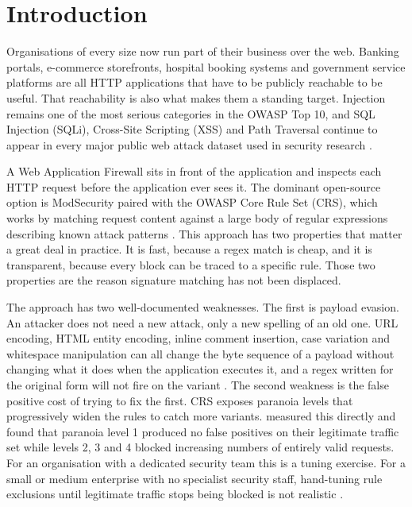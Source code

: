 \documentclass[runningheads]{llncs}
\begin{document}
\section{Introduction}

Organisations of every size now run part of their business over the
web. Banking portals, e-commerce storefronts, hospital booking systems
and government service platforms are all HTTP applications that have to
be publicly reachable to be useful. That reachability is also what makes
them a standing target. Injection remains one of the most serious
categories in the OWASP Top 10, and SQL Injection (SQLi), Cross-Site
Scripting (XSS) and Path Traversal continue to appear in every major
public web attack dataset used in security research
\citep{owasptop10,durmuskaya2025}.

A Web Application Firewall sits in front of the application and inspects
each HTTP request before the application ever sees it. The dominant
open-source option is ModSecurity paired with the OWASP Core Rule Set
(CRS), which works by matching request content against a large body of
regular expressions describing known attack patterns
\citep{owaspcrs2024,owaspwaf2024}. This approach has two properties that
matter a great deal in practice. It is fast, because a regex match is
cheap, and it is transparent, because every block can be traced to a
specific rule. Those two properties are the reason signature matching
has not been displaced.

The approach has two well-documented weaknesses. The first is payload
evasion. An attacker does not need a new attack, only a new spelling of
an old one. URL encoding, HTML entity encoding, inline comment
insertion, case variation and whitespace manipulation can all change the
byte sequence of a payload without changing what it does when the
application executes it, and a regex written for the original form will
not fire on the variant \citep{qu2024,demetrio2020}. The second weakness
is the false positive cost of trying to fix the first. CRS exposes
paranoia levels that progressively widen the rules to catch more
variants. \citet{reyesnarvaez2025} measured this
directly and found that paranoia level 1 produced no false positives on
their legitimate traffic set while levels 2, 3 and 4 blocked increasing
numbers of entirely valid requests. For an organisation with a dedicated
security team this is a tuning exercise. For a small or medium
enterprise with no specialist security staff, hand-tuning rule
exclusions until legitimate traffic stops being blocked is not realistic
\citep{rombaldo2023}.
\end{document}
